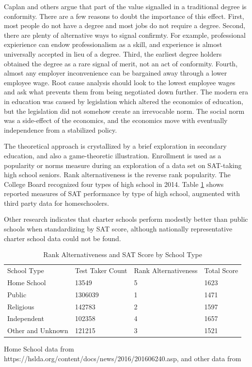 \documentclass[AER]{./aea-latex-templates/AEA}
\begin{document}
Caplan and others argue that part of the value signalled in a traditional degree is conformity. There
are a few reasons to doubt the importance of this effect. First, most people do not have a degree and most jobs
do not require a degree. Second, there are plenty of alternative ways to signal confirmty. For example, professional expierience
can endow professionalism as a skill, and experience is almost universally accepted in lieu of a degree.
Third, the earliest degree holders obtained the degree as a rare signal of merit, not an act of
conformity. Fourth, almost any employer inconvenience can be bargained away through a lower employee
wage. Root cause analysis should look to the lowest employee wages and ask what prevents them from
being negotiated down further. The modern era in education was caused by legislation which altered the economics of education,
but the legislation did not somehow create an irrevocable norm. The social norm was a side-effect of the economics, and the economics
move with eventually independence from a stabilized policy.

The theoretical approach is crystallized by a brief exploration in
secondary education, and also a game-theoretic illustration. Enrollment is used as
a popularity or norms measure during an exploration of a data set on SAT-taking
high school seniors. Rank alternativeness is the reverse rank popularity. The College Board recognized four types of high
school in 2014\cite{collegeboard_2014}. Table \ref{tab:rank_alt_and_sat_by_school_type} shows reported measures of SAT performance by type of
high school, augmented with third party data for homeschoolers\cite{mullins_2016}.

Other research indicates that charter schools\cite{di2011evidence} perform modestly better than
public schools when standardizing by SAT score, although nationally
representative charter school data could not be found.

\begin{table}
\caption{Rank Alternativeness and SAT Score by School Type}
\begin{tabular}{llll}
School Type & Test Taker Count & Rank Alternativeness & Total Score \\
Home School & 13549 & 5 & 1623 \\
Public & 1306039 & 1 & 1471 \\
Religious & 142783 & 2 & 1597 \\
Independent & 102358 & 4 & 1657 \\
Other and Unknown & 121215 & 3 & 1521 %
\end{tabular}
\begin{tablenotes}[Source]
Home School data from https://hslda.org/content/docs/news/2016/201606240.asp,
and other data from \cite{collegeboard_2014} %
\end{tablenotes}
\label{tab:rank_alt_and_sat_by_school_type}
\end{table}
\end{document}
